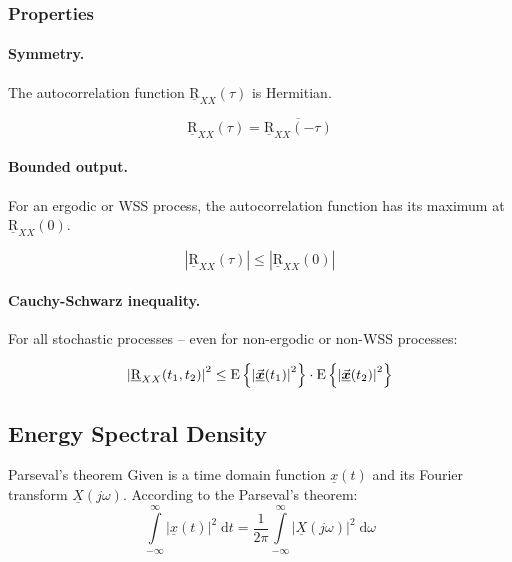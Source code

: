 \begin{refsection}
\subsubsection{Properties}

\paragraph{Symmetry.}

The autocorrelation function $\underline{\mathrm{R}}_{XX}(\tau)$ is Hermitian.

\begin{equation}
	\underline{\mathrm{R}}_{XX}(\tau) = \overline{\underline{\mathrm{R}}_{XX}(-\tau)}
	\label{eq:ch02:autocorr_hermitian}
\end{equation}

\paragraph{Bounded output.}

For an ergodic or \ac{WSS} process, the autocorrelation function has its maximum at $\underline{\mathrm{R}}_{XX}(0)$.

\begin{equation}
	\left|\underline{\mathrm{R}}_{XX}(\tau)\right| \leq \left|\underline{\mathrm{R}}_{XX}(0)\right|
\end{equation}

\paragraph{Cauchy-Schwarz inequality.}

For all stochastic processes -- even for non-ergodic or non-\acs{WSS} processes:

\begin{equation}
	\left|\underline{\mathrm{R}}_{XX}(t_1, t_2)\right|^2 \leq \mathrm{E}\left\{ \left|\vec{\bm{\underline{x}}}(t_1)\right|^2 \right\} \cdot \mathrm{E}\left\{ \left|\vec{\bm{\underline{x}}}(t_2)\right|^2 \right\}
\end{equation}

\subsection{Energy Spectral Density}

\begin{definition}{Parseval's theorem}
	Given is a time domain function $\underline{x}(t)$ and its Fourier transform $\underline{X}\left(j \omega\right)$. According to the  Parseval's theorem:
	\begin{equation}
		\int\limits_{-\infty}^{\infty} \left|\underline{x}(t)\right|^2 \; \mathrm{d} t = \frac{1}{2 \pi} \int\limits_{-\infty}^{\infty} \left|\underline{X}\left(j \omega\right)\right|^2 \; \mathrm{d} \omega
	\end{equation}
\end{definition}


\end{refsection}
